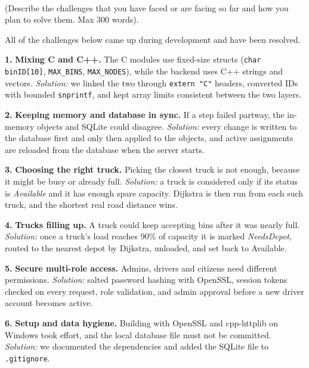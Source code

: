 \documentclass[11pt,a4paper]{article}
\newcommand{\qhead}[2]{\vspace{8pt}{\color{subhead}\LARGE #1}\\[-1pt]{\color{hint}\small #2}\par\vspace{2pt}}
\begin{document}
\qhead{Challenges/Roadblocks (7 pts)}{(Describe the challenges that you have faced or are facing so far and how you plan to solve them. Max 300 words).}
\begin{answer}
All of the challenges below came up during development and have been resolved.\par\smallskip
\textbf{1.} \textbf{Mixing C and C++.} The C modules use fixed-size structs (\texttt{char binID[10]}, \texttt{MAX\_BINS}, \texttt{MAX\_NODES}), while the backend uses C++ strings and vectors. \emph{Solution:} we linked the two through \texttt{extern "C"} headers, converted IDs with bounded \texttt{snprintf}, and kept array limits consistent between the two layers.
\par\medskip
\textbf{2.} \textbf{Keeping memory and database in sync.} If a step failed partway, the in-memory objects and SQLite could disagree. \emph{Solution:} every change is written to the database first and only then applied to the objects, and active assignments are reloaded from the database when the server starts.
\par\medskip
\textbf{3.} \textbf{Choosing the right truck.} Picking the closest truck is not enough, because it might be busy or already full. \emph{Solution:} a truck is considered only if its status is \emph{Available} and it has enough spare capacity. Dijkstra is then run from each such truck, and the shortest real road distance wins.
\par\medskip
\textbf{4.} \textbf{Trucks filling up.} A truck could keep accepting bins after it was nearly full. \emph{Solution:} once a truck's load reaches 90\% of capacity it is marked \emph{NeedsDepot}, routed to the nearest depot by Dijkstra, unloaded, and set back to Available.
\par\medskip
\textbf{5.} \textbf{Secure multi-role access.} Admins, drivers and citizens need different permissions. \emph{Solution:} salted password hashing with OpenSSL, session tokens checked on every request, role validation, and admin approval before a new driver account becomes active.
\par\medskip
\textbf{6.} \textbf{Setup and data hygiene.} Building with OpenSSL and cpp-httplib on Windows took effort, and the local database file must not be committed. \emph{Solution:} we documented the dependencies and added the SQLite file to \texttt{.gitignore}.
\end{answer}
\end{document}
